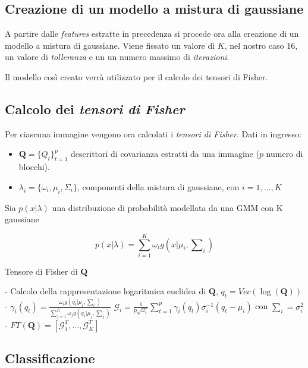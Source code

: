 \subsection{Creazione di un modello a mistura di gaussiane}

A partire dalle \emph{features} estratte in precedenza si procede ora alla creazione di un modello a mistura di gaussiane. Viene fissato un valore di $K$, nel nostro caso 16, un valore di \emph{tolleranza} e un un numero massimo di \emph{iterazioni}.

Il modello così creato verrà utilizzato per il calcolo dei tensori di Fisher.

\subsection{Calcolo dei \emph{tensori di Fisher}}

Per ciascuna immagine vengono ora calcolati i \emph{tensori di Fisher}. Dati in ingresso:
\begin{itemize}
\item $\mathbf{Q} = \{ Q_t \}_{t = 1}^{p}$ descrittori di covarianza estratti da una immagine ($p$ numero di blocchi).
\item $\lambda_i = \{\omega_i, \mu_i, \Sigma_i\}$, componenti della mistura di gaussiane, con $i = 1, \ldots, K$
\end{itemize}

Sia $p(x| \lambda)$ una distribuzione di probabilità modellata da una GMM con K gaussiane

$$p(x | \lambda) = \sum_{i = 1}^{K} \omega_i g(x | \mu_i, \mathcal{\sum}_i)$$

\begin{algorithm}[H]
\caption{Tensore di Fisher di $\mathbf{Q}$}
\begin{algorithmic}
\State - Calcolo della rappresentazione logaritmica euclidea di $\mathbf{Q}$, $q_t = Vec(\log(\mathbf{Q}))$
\State - $\gamma_i(q_t) = \frac{\omega_i g(q_t | \mu_i, \sum_i)}{\sum_{j=1}^{K} \omega_j g(q_t | \mu_j , \sum_j)}$
\State $\mathcal{G}_i = \frac{1}{p\sqrt{\omega_i}} \sum_{t = 1}^{p} \gamma_i(q_t) \sigma_{i}^{-1} (q_t - \mu_i) $ con $\sum_i = \sigma_{i}^{2}$
\EndFor
\State - $FT(\mathbf{Q}) = [\mathcal{G}_{1}^T, \ldots, \mathcal{G}_{K}^T]$
\end{algorithmic}
\end{algorithm}

\subsection{Classificazione}

